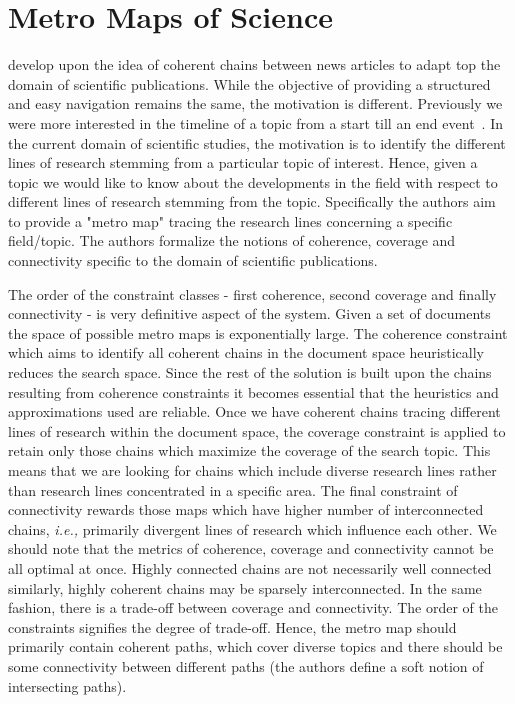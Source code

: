\documentclass[10pt]{article}
\begin{document}
\section{Metro Maps of Science}
\citet{shahaf2012metro} develop upon the idea of coherent chains between news articles to adapt top the domain of scientific publications. While the objective of providing a structured and easy navigation remains the same, the motivation is different. Previously we were more interested in the timeline of a topic from a start till an end event~\cite{shahaf2010connecting}. In the current domain of scientific studies, the motivation is to identify the different lines of research stemming from a particular topic of interest. Hence, given a topic we would like to know about the developments in the field with respect to different lines of research stemming from the topic. Specifically the authors aim to provide a "metro map" tracing the research lines concerning a specific field/topic. The authors formalize the notions of coherence, coverage and connectivity specific to the domain of scientific publications.

\par The order of the constraint classes - first coherence, second coverage and finally connectivity - is very definitive aspect of the system. Given a set of documents the space of possible metro maps is exponentially large. The coherence constraint which aims to identify all coherent chains in the document space heuristically reduces the search space. Since the rest of the solution is built upon the chains resulting from coherence constraints it becomes essential that the heuristics and approximations used are reliable. Once we have coherent chains tracing different lines of research within the document space, the coverage constraint is applied to retain only those chains which maximize the coverage of the search topic. This means that we are looking for chains which include diverse research lines rather than research lines concentrated in a specific area. The final constraint of connectivity rewards those maps which have higher number of interconnected chains, \emph{i.e.,} primarily divergent lines of research which influence each other. We should note that the metrics of coherence, coverage and connectivity cannot be all optimal at once. Highly connected chains are not necessarily well connected similarly, highly coherent chains may be sparsely interconnected. In the same fashion, there is a trade-off between coverage and connectivity. The order of the constraints signifies the degree of trade-off. Hence, the metro map should primarily contain coherent paths, which cover diverse topics and there should be some connectivity between different paths (the authors define a soft notion of intersecting paths).
\end{document}
